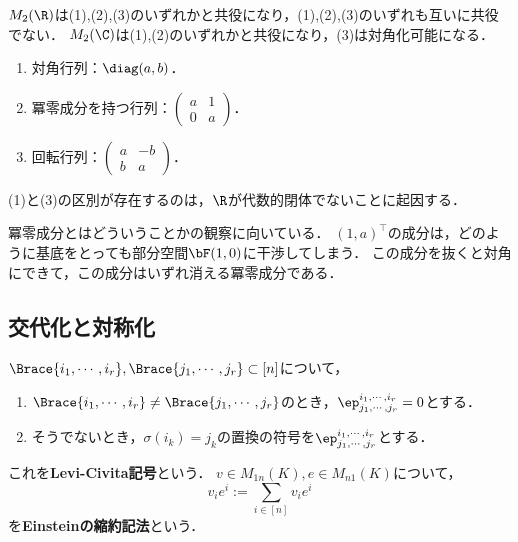 \documentclass[uplatex, dvipdfmx]{jsreport}
\begin{document}
\begin{proposition}
    $M_2(\R)$は(1),(2),(3)のいずれかと共役になり，(1),(2),(3)のいずれも互いに共役でない．
    $M_2(\C)$は(1),(2)のいずれかと共役になり，(3)は対角化可能になる．
    \begin{enumerate}
        \item 対角行列：$\diag(a,b)$．
        \item 冪零成分を持つ行列：$\begin{pmatrix}a&1\\0&a\end{pmatrix}$．
        \item 回転行列：$\begin{pmatrix}a&-b\\b&a\end{pmatrix}$．
    \end{enumerate}
    (1)と(3)の区別が存在するのは，$\R$が代数的閉体でないことに起因する．
\end{proposition}
\begin{remarks}
    冪零成分とはどういうことかの観察に向いている．
    $(1,a)^\top$の成分は，どのように基底をとっても部分空間$\bF(1,0)$に干渉してしまう．
    この成分を抜くと対角にできて，この成分はいずれ消える冪零成分である．
\end{remarks}

\subsection{交代化と対称化}

\begin{notation}
    $\Brace{i_1,\cdots,i_r},\Brace{j_1,\cdots,j_r}\subset[n]$について，
    \begin{enumerate}
        \item $\Brace{i_1,\cdots,i_r}\ne\Brace{j_1,\cdots,j_r}$のとき，$\ep^{i_1,\cdots,i_r}_{j_1,\cdots,j_r}=0$とする．
        \item そうでないとき，$\sigma(i_k)=j_k$の置換の符号を$\ep^{i_1,\cdots,i_r}_{j_1,\cdots,j_r}$とする．
    \end{enumerate}
    これを\textbf{Levi-Civita記号}という．
    $v\in M_{1n}(K),e\in M_{n1}(K)$について，
    \[v_ie^i:=\sum_{i\in[n]}v_ie^i\]
    を\textbf{Einsteinの縮約記法}という．
\end{notation}
\end{document}
